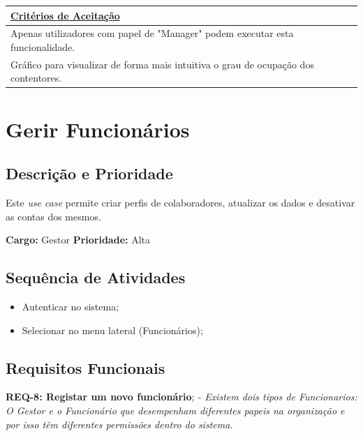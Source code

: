 \documentclass{scrreprt}
\begin{document}
		\begin{tabular}{|p{5.2in}|p{0.7in}|} \hline 
		\underline{Critérios de Aceitação} \\ \hline 
		Apenas utilizadores com papel de "Manager" podem executar esta funcionalidade. \\ \hline 
		Gráfico para visualizar de forma mais intuitiva o grau de ocupação dos contentores.\\ \hline
	\end{tabular}\newline\newline
	
	\section{Gerir Funcionários}
	
	\subsection{Descrição e Prioridade}
	
	Este \textit{use case} permite criar perfis de colaboradores, atualizar os dados e desativar as contas dos mesmos.
	
	\textbf{Cargo: }Gestor  \newline
	\textbf{Prioridade: }Alta \newline
	
	\subsection{Sequência de Atividades}
	
	\begin{itemize}
		\item Autenticar no sistema;
		\item Selecionar no menu lateral (Funcionários);
	\end{itemize}
	
	\subsection{Requisitos Funcionais}
	\textbf{REQ-8: Registar um novo funcionário};\newline
	    \textit{- Existem dois tipos de Funcionarios: O Gestor e o Funcionário que desempenham diferentes papeis na organização e por isso têm diferentes permissões dentro do sistema.} \newline\newline
		
\end{document}
